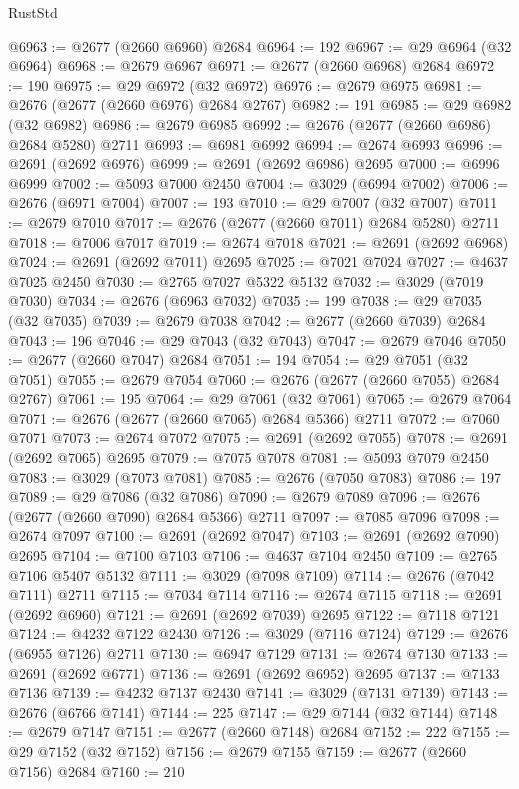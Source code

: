 \begin{lexlean}{RustStd}
\begin{coremodule}
{\begin{coremodule}
{{{{{{{{{{{{{{{{{{{{{{{{{{{{{{{{{{{{{{{{{{{{{{{{{{{{{{{@6963 := @2677 (@2660 @6960) @2684
@6964 := 192
@6967 := @29 @6964 (@32 @6964)
@6968 := @2679 @6967
@6971 := @2677 (@2660 @6968) @2684
@6972 := 190
@6975 := @29 @6972 (@32 @6972)
@6976 := @2679 @6975
@6981 := @2676 (@2677 (@2660 @6976) @2684 @2767)
@6982 := 191
@6985 := @29 @6982 (@32 @6982)
@6986 := @2679 @6985
@6992 := @2676 (@2677 (@2660 @6986) @2684 @5280) @2711
@6993 := @6981 @6992
@6994 := @2674 @6993
@6996 := @2691 (@2692 @6976)
@6999 := @2691 (@2692 @6986) @2695
@7000 := @6996 @6999
@7002 := @5093 @7000 @2450
@7004 := @3029 (@6994 @7002)
@7006 := @2676 (@6971 @7004)
@7007 := 193
@7010 := @29 @7007 (@32 @7007)
@7011 := @2679 @7010
@7017 := @2676 (@2677 (@2660 @7011) @2684 @5280) @2711
@7018 := @7006 @7017
@7019 := @2674 @7018
@7021 := @2691 (@2692 @6968)
@7024 := @2691 (@2692 @7011) @2695
@7025 := @7021 @7024
@7027 := @4637 @7025 @2450
@7030 := @2765 @7027 @5322 @5132
@7032 := @3029 (@7019 @7030)
@7034 := @2676 (@6963 @7032)
@7035 := 199
@7038 := @29 @7035 (@32 @7035)
@7039 := @2679 @7038
@7042 := @2677 (@2660 @7039) @2684
@7043 := 196
@7046 := @29 @7043 (@32 @7043)
@7047 := @2679 @7046
@7050 := @2677 (@2660 @7047) @2684
@7051 := 194
@7054 := @29 @7051 (@32 @7051)
@7055 := @2679 @7054
@7060 := @2676 (@2677 (@2660 @7055) @2684 @2767)
@7061 := 195
@7064 := @29 @7061 (@32 @7061)
@7065 := @2679 @7064
@7071 := @2676 (@2677 (@2660 @7065) @2684 @5366) @2711
@7072 := @7060 @7071
@7073 := @2674 @7072
@7075 := @2691 (@2692 @7055)
@7078 := @2691 (@2692 @7065) @2695
@7079 := @7075 @7078
@7081 := @5093 @7079 @2450
@7083 := @3029 (@7073 @7081)
@7085 := @2676 (@7050 @7083)
@7086 := 197
@7089 := @29 @7086 (@32 @7086)
@7090 := @2679 @7089
@7096 := @2676 (@2677 (@2660 @7090) @2684 @5366) @2711
@7097 := @7085 @7096
@7098 := @2674 @7097
@7100 := @2691 (@2692 @7047)
@7103 := @2691 (@2692 @7090) @2695
@7104 := @7100 @7103
@7106 := @4637 @7104 @2450
@7109 := @2765 @7106 @5407 @5132
@7111 := @3029 (@7098 @7109)
@7114 := @2676 (@7042 @7111) @2711
@7115 := @7034 @7114
@7116 := @2674 @7115
@7118 := @2691 (@2692 @6960)
@7121 := @2691 (@2692 @7039) @2695
@7122 := @7118 @7121
@7124 := @4232 @7122 @2430
@7126 := @3029 (@7116 @7124)
@7129 := @2676 (@6955 @7126) @2711
@7130 := @6947 @7129
@7131 := @2674 @7130
@7133 := @2691 (@2692 @6771)
@7136 := @2691 (@2692 @6952) @2695
@7137 := @7133 @7136
@7139 := @4232 @7137 @2430
@7141 := @3029 (@7131 @7139)
@7143 := @2676 (@6766 @7141)
@7144 := 225
@7147 := @29 @7144 (@32 @7144)
@7148 := @2679 @7147
@7151 := @2677 (@2660 @7148) @2684
@7152 := 222
@7155 := @29 @7152 (@32 @7152)
@7156 := @2679 @7155
@7159 := @2677 (@2660 @7156) @2684
@7160 := 210
}}}}}}}}}}}}}}}}}}}}}}}}}}}}}}}}}}}}}}}}}}}}}}}}}}}}}}}
\end{coremodule}}
\end{coremodule}
\end{lexlean}
